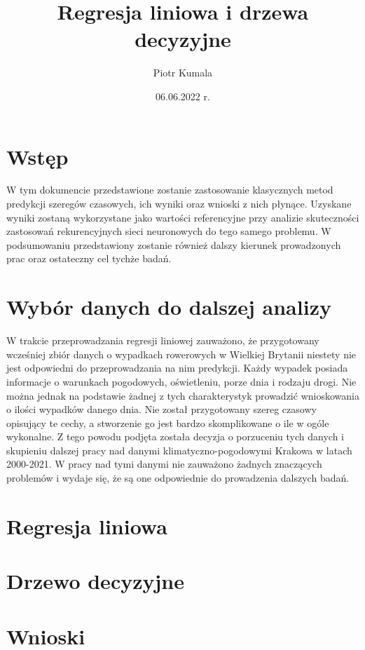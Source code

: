 \documentclass{article}
\title{Regresja liniowa i drzewa decyzyjne}
\author{Piotr Kumala}
\date{06.06.2022 r.}
\begin{document}
	
	\maketitle
	
	\section{Wstęp}
	W tym dokumencie przedstawione zostanie zastosowanie klasycznych metod predykcji szeregów czasowych, ich wyniki oraz wnioski z nich płynące. Uzyskane wyniki zostaną wykorzystane jako wartości referencyjne przy analizie skuteczności zastosowań rekurencyjnych sieci neuronowych do tego samego problemu. W podsumowaniu przedstawiony zostanie również dalszy kierunek prowadzonych prac oraz ostateczny cel tychże badań. 
	
	\section{Wybór danych do dalszej analizy}
	W trakcie przeprowadzania regresji liniowej zauważono, że przygotowany wcześniej zbiór danych o wypadkach rowerowych w Wielkiej Brytanii niestety nie jest odpowiedni do przeprowadzania na nim predykcji. Każdy wypadek posiada informacje o warunkach pogodowych, oświetleniu, porze dnia i rodzaju drogi. Nie można jednak na podstawie żadnej z tych charakterystyk prowadzić wnioskowania o ilości wypadków danego dnia. Nie został przygotowany szereg czasowy opisujący te cechy, a stworzenie go jest bardzo skomplikowane o ile w ogóle wykonalne. 
	Z tego powodu podjęta została decyzja o porzuceniu tych danych i skupieniu dalszej pracy nad danymi klimatyczno-pogodowymi Krakowa w latach 2000-2021. W pracy nad tymi danymi nie zauważono żadnych znaczących problemów i wydaje się, że są one odpowiednie do prowadzenia dalszych badań. 
	
	\section{Regresja liniowa}
	\section{Drzewo decyzyjne}
	\section{Wnioski}
	
\end{document}
